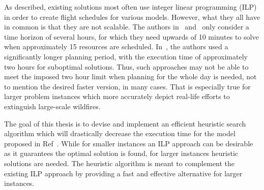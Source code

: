 As described, existing solutions most often use integer linear programming (ILP) in order to create flight schedules for various models.
However, what they all have in common is that they are not scalable.
The authors in~\cite{Veiga/FullScheduler} and~\cite{Veiga/AerialScheduler} only consider a time horizon of several hours, for which they need upwards of 10 minutes to solve when approximately 15 resources are scheduled.
In~\cite{SkorinKapov/ILP}, the authors used a significantly longer planning period, with the execution time of approximately two hours for suboptimal solutions.
Thus, such approaches may not be able to meet the imposed two hour limit when planning for the whole day is needed, not to mention the desired faster version, in many cases.
That is especially true for larger problem instances which more accurately depict real-life efforts to extinguish large-scale wildfires.

The goal of this thesis is to devise and implement an efficient heuristic search algorithm which will drastically decrease the execution time for the model proposed in Ref~\cite{SkorinKapov/ILP}.
While for smaller instances an ILP approach can be desirable as it guarantees the optimal solution is found, for larger instances heuristic solutions are needed.
The heuristic algorithm is meant to complement the existing ILP approach by providing a fast and effective alternative for larger instances.

